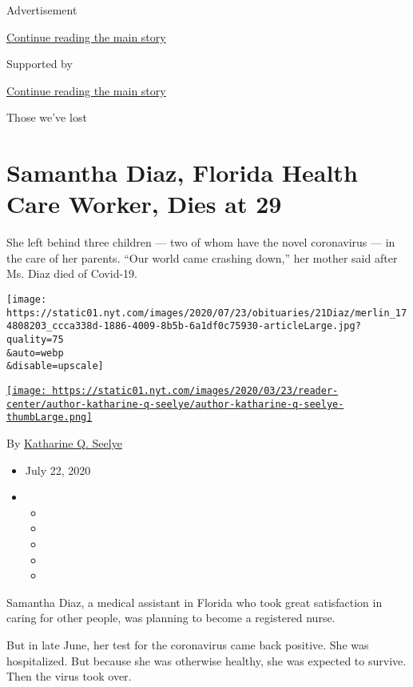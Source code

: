 Advertisement

\protect\hyperlink{after-top}{Continue reading the main story}

Supported by

\protect\hyperlink{after-sponsor}{Continue reading the main story}

Those we've lost

\hypertarget{samantha-diaz-florida-health-care-worker-dies-at-29}{%
\section{Samantha Diaz, Florida Health Care Worker, Dies at
29}\label{samantha-diaz-florida-health-care-worker-dies-at-29}}

She left behind three children --- two of whom have the novel
coronavirus --- in the care of her parents. ``Our world came crashing
down,'' her mother said after Ms. Diaz died of Covid-19.

\texttt{[image: https://static01.nyt.com/images/2020/07/23/obituaries/21Diaz/merlin\_174808203\_ccca338d-1886-4009-8b5b-6a1df0c75930-articleLarge.jpg?quality=75\\\&auto=webp\\\&disable=upscale]}

\href{https://www.nytimes.com/by/katharine-q-seelye}{\texttt{[image: https://static01.nyt.com/images/2020/03/23/reader-center/author-katharine-q-seelye/author-katharine-q-seelye-thumbLarge.png]}}

By \href{https://www.nytimes.com/by/katharine-q-seelye}{Katharine Q.
Seelye}

\begin{itemize}
\item
  July 22, 2020
\item
  \begin{itemize}
  \item
  \item
  \item
  \item
  \item
  \end{itemize}
\end{itemize}

Samantha Diaz, a medical assistant in Florida who took great
satisfaction in caring for other people, was planning to become a
registered nurse.

But in late June, her test for the coronavirus came back positive. She
was hospitalized. But because she was otherwise healthy, she was
expected to survive. Then the virus took over.

